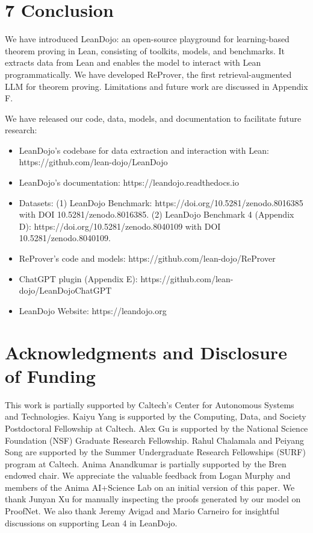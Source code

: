\documentclass[
]{article}
\providecommand{\tightlist}{%
  \setlength{\itemsep}{0pt}\setlength{\parskip}{0pt}}
\begin{document}
\section{7 Conclusion}\label{conclusion}

We have introduced LeanDojo: an open-source playground for
learning-based theorem proving in Lean, consisting of toolkits, models,
and benchmarks. It extracts data from Lean and enables the model to
interact with Lean programmatically. We have developed ReProver, the
first retrieval-augmented LLM for theorem proving. Limitations and
future work are discussed in Appendix F.

We have released our code, data, models, and documentation to facilitate
future research:

\begin{itemize}
\tightlist
\item
  LeanDojo's codebase for data extraction and interaction with Lean:
  https://github.com/lean-dojo/LeanDojo\\
\item
  LeanDojo's documentation: https://leandojo.readthedocs.io\\
\item
  Datasets: (1) LeanDojo Benchmark:
  https://doi.org/10.5281/zenodo.8016385 with DOI
  10.5281/zenodo.8016385. (2) LeanDojo Benchmark 4 (Appendix D):
  https://doi.org/10.5281/zenodo.8040109 with DOI
  10.5281/zenodo.8040109.\\
\item
  ReProver's code and models: https://github.com/lean-dojo/ReProver\\
\item
  ChatGPT plugin (Appendix E):
  https://github.com/lean-dojo/LeanDojoChatGPT\\
\item
  LeanDojo Website: https://leandojo.org
\end{itemize}

\section{Acknowledgments and Disclosure of
Funding}\label{acknowledgments-and-disclosure-of-funding}

This work is partially supported by Caltech's Center for Autonomous
Systems and Technologies. Kaiyu Yang is supported by the Computing,
Data, and Society Postdoctoral Fellowship at Caltech. Alex Gu is
supported by the National Science Foundation (NSF) Graduate Research
Fellowship. Rahul Chalamala and Peiyang Song are supported by the Summer
Undergraduate Research Fellowships (SURF) program at Caltech. Anima
Anandkumar is partially supported by the Bren endowed chair. We
appreciate the valuable feedback from Logan Murphy and members of the
Anima AI+Science Lab on an initial version of this paper. We thank
Junyan Xu for manually inspecting the proofs generated by our model on
ProofNet. We also thank Jeremy Avigad and Mario Carneiro for insightful
discussions on supporting Lean 4 in LeanDojo.
\end{document}
